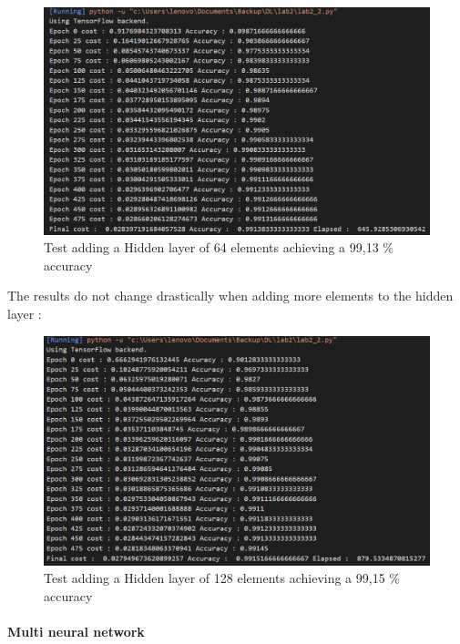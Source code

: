 \documentclass[a4paper,12pt,twoside]{report}
\begin{document}
\begin{figure}[H]
\centering
\includegraphics[scale = 0.6]{lab2_2_cost_acc_64.png}
\caption{Test adding a Hidden layer of 64 elements achieving a 99,13 \% accuracy}
\end{figure}

The results do not change drastically when adding more elements to the hidden layer : 

\begin{figure}[H]
\centering
\includegraphics[scale = 0.6]{lab2_2_cost_acc.png}
\caption{Test adding a Hidden layer of 128 elements achieving a 99,15 \% accuracy}
\end{figure}

\paragraph{Multi neural network}
\end{document}
